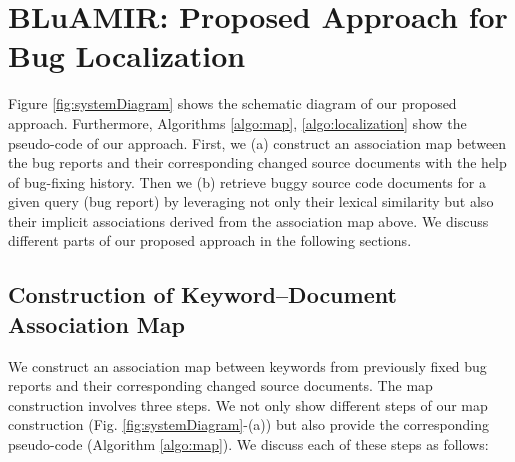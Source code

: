 \documentclass[sigconf,review,anonymous]{acmart}
\begin{document}
\section{BLuAMIR: Proposed Approach for Bug Localization} \label{sec:proposedmethod} 
Figure \ref{fig:systemDiagram} shows the schematic diagram of our proposed approach.
Furthermore, Algorithms \ref{algo:map}, \ref{algo:localization} show the pseudo-code of our approach. 
First, we (a) construct an association map between the bug reports and their corresponding changed source documents with the help of bug-fixing history.
Then we (b) retrieve buggy source code documents for a given query (bug report) by leveraging not only their lexical similarity but also their implicit associations derived from the association map above.   
We discuss different parts of our proposed approach in the following sections.

\subsection{Construction of Keyword--Document Association Map}\label{sec:MapConstruction}
We construct an association map between keywords from previously fixed bug reports and their corresponding changed source documents.
The map construction involves three steps.
We not only show different steps of our map construction  (Fig. \ref{fig:systemDiagram}-(a)) but also provide the corresponding pseudo-code (Algorithm \ref{algo:map}). We discuss each of these steps as follows:

\end{document}
